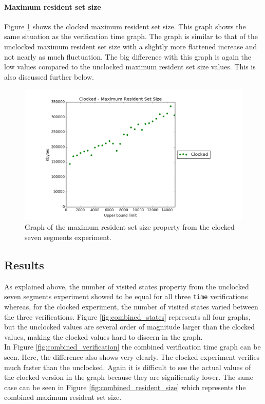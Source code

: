 \paragraph{Maximum resident set size}
Figure \ref{fig:clocked_resident_size} shows the clocked maximum resident set size. This graph shows the same situation as the verification time graph. The graph is similar to that of the unclocked maximum resident set size with a slightly more flattened increase and not nearly as much fluctuation. The big difference with this graph is again the low values compared to the unclocked maximum resident set size values. This is also discussed further below.
\begin{figure}
    \centering
    \includegraphics[scale=0.6]{./figures/plots/clocked_size.png}
\caption{Graph of the maximum resident set size property from the clocked seven segments experiment.}
\label{fig:clocked_resident_size}
\end{figure}
\subsection{Results}
As explained above, the number of visited states property from the unclocked seven segments experiment showed to be equal for all three \texttt{time} verifications whereas, for the clocked experiment, the number of visited states varied between the three verifications. Figure \ref{fig:combined_states} represents all four graphs, but the unclocked values are several order of magnitude larger than the clocked values, making the clocked values hard to discern in the graph.\\

In Figure \ref{fig:combined_verification} the combined verification time graph can be seen. Here, the difference also shows very clearly. The clocked experiment verifies much faster than the unclocked. Again it is difficult to see the actual values of the clocked version in the graph because they are significantly lower. The same case can be seen in Figure \ref{fig:combined_resident_size} which represents the combined maximum resident set size. \\

